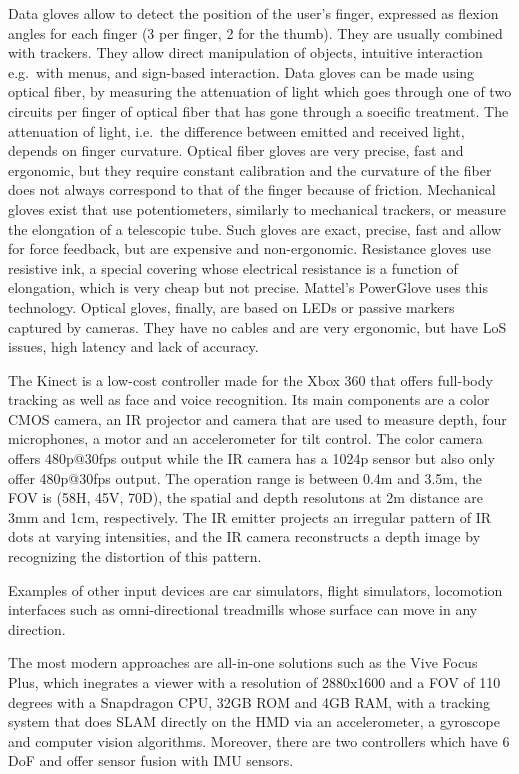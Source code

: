 \documentclass[a4paper]{article}
\begin{document}
Data gloves allow to detect the position of the user's finger, expressed
as flexion angles for each finger (3 per finger, 2 for the thumb). They
are usually combined with trackers. They allow direct manipulation of
objects, intuitive interaction e.g.~with menus, and sign-based
interaction. Data gloves can be made using optical fiber, by measuring
the attenuation of light which goes through one of two circuits per
finger of optical fiber that has gone through a soecific treatment. The
attenuation of light, i.e.~the difference between emitted and received
light, depends on finger curvature. Optical fiber gloves are very
precise, fast and ergonomic, but they require constant calibration and
the curvature of the fiber does not always correspond to that of the
finger because of friction. Mechanical gloves exist that use
potentiometers, similarly to mechanical trackers, or measure the
elongation of a telescopic tube. Such gloves are exact, precise, fast
and allow for force feedback, but are expensive and non-ergonomic.
Resistance gloves use resistive ink, a special covering whose electrical
resistance is a function of elongation, which is very cheap but not
precise. Mattel's PowerGlove uses this technology. Optical gloves,
finally, are based on LEDs or passive markers captured by cameras. They
have no cables and are very ergonomic, but have LoS issues, high latency
and lack of accuracy.

The Kinect is a low-cost controller made for the Xbox 360 that offers
full-body tracking as well as face and voice recognition. Its main
components are a color CMOS camera, an IR projector and camera that are
used to measure depth, four microphones, a motor and an accelerometer
for tilt control. The color camera offers 480p@30fps output while the IR
camera has a 1024p sensor but also only offer 480p@30fps output. The
operation range is between 0.4m and 3.5m, the FOV is (58H, 45V, 70D),
the spatial and depth resolutons at 2m distance are 3mm and 1cm,
respectively. The IR emitter projects an irregular pattern of IR dots at
varying intensities, and the IR camera reconstructs a depth image by
recognizing the distortion of this pattern.

Examples of other input devices are car simulators, flight simulators,
locomotion interfaces such as omni-directional treadmills whose surface
can move in any direction.

The most modern approaches are all-in-one solutions such as the Vive
Focus Plus, which inegrates a viewer with a resolution of 2880x1600 and
a FOV of 110 degrees with a Snapdragon CPU, 32GB ROM and 4GB RAM, with a
tracking system that does SLAM directly on the HMD via an accelerometer,
a gyroscope and computer vision algorithms. Moreover, there are two
controllers which have 6 DoF and offer sensor fusion with IMU sensors.
\end{document}
